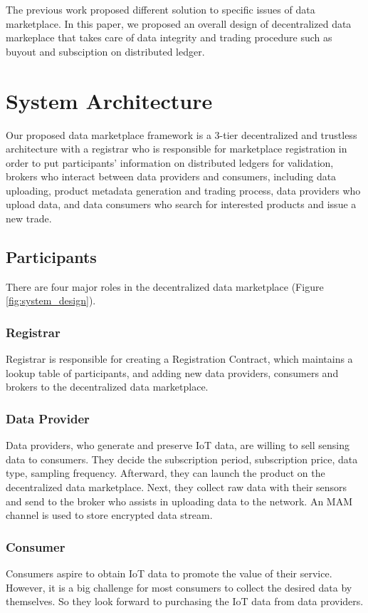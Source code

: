 \documentclass[journal,a4paper]{IEEEtran}
\begin{document}
The previous work proposed different solution to specific issues of data marketplace. In this paper, we proposed an  overall design of decentralized data markeplace that takes care of data integrity and trading procedure such as buyout and subsciption on distributed ledger.

\section{System Architecture}
Our proposed data marketplace framework is a 3-tier decentralized and trustless architecture with a registrar who is responsible for marketplace registration in order to put participants' information on distributed ledgers for validation, brokers who interact between data providers and consumers, including data uploading, product metadata generation and trading process, data providers who upload data, and data consumers who search for interested products and issue a new trade.

\subsection{Participants}
There are four major roles in the decentralized data marketplace (Figure \ref{fig:system_design}).

\subsubsection{Registrar}
Registrar is responsible for creating a Registration Contract, which maintains a lookup table of participants, and adding new data providers, consumers and brokers to the decentralized data marketplace.

\subsubsection{Data Provider}
Data providers, who generate and preserve IoT data, are willing to sell sensing data to consumers. They decide the subscription period, subscription price, data type, sampling frequency. Afterward, they can launch the product on the decentralized data marketplace. Next, they collect raw data with their sensors and send to the broker who assists in uploading data to the network. An MAM channel\cite{MAM} is used to store encrypted data stream.

\subsubsection{Consumer}
Consumers aspire to obtain IoT data to promote the value of their service. However, it is a big challenge for most consumers to collect the desired data by themselves. So they look forward to purchasing the IoT data from data providers.
\end{document}
